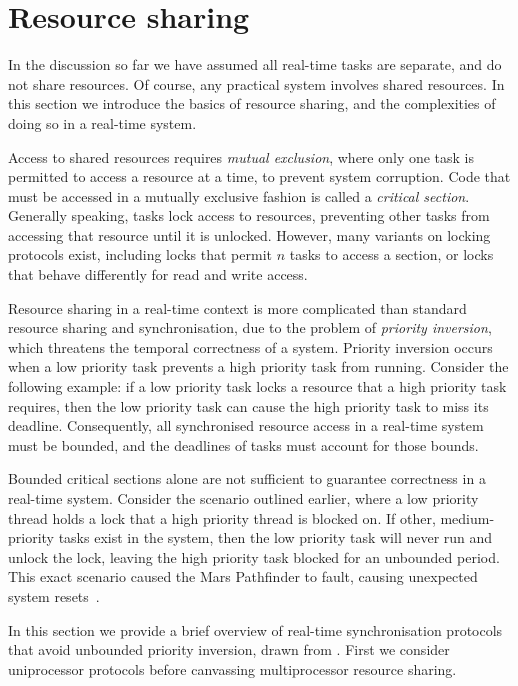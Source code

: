 \section{Resource sharing}
\label{sec:resource-sharing-theory}

In the discussion so far we have assumed all real-time tasks are separate, and do not share resources.
Of course, any practical system involves shared resources. In this section we introduce the basics
of resource sharing, and the complexities of doing so in a real-time system.

Access to shared resources requires \emph{mutual exclusion}, where only one 
task is permitted to access a resource at a time, to prevent system corruption. Code that
must be accessed in a mutually exclusive fashion is called a \emph{critical section}. Generally
speaking, tasks lock access to resources, preventing other tasks from accessing that resource
until it is unlocked. However, many variants on locking protocols exist, including locks that permit
$n$ tasks to access a section, or locks that behave differently for read and write access.

Resource sharing in a real-time context is more complicated than standard resource sharing and
synchronisation, due to the problem of \emph{priority inversion}, which threatens the temporal
correctness of a system.  Priority inversion occurs when a low priority task prevents a high
priority task from running.  Consider the following example: if a low priority task locks a resource
that a high priority task requires, then the low priority task can cause the high priority task to
miss its deadline.  Consequently, all synchronised resource access in a real-time system must be
bounded, and the deadlines of tasks must account for those bounds.

Bounded critical sections alone are not sufficient to guarantee correctness in a real-time
system. Consider the scenario outlined earlier, where a low priority thread holds a lock that a high
priority thread is blocked on.  If other, medium-priority tasks exist in the system, then the low
priority task will never run and unlock the lock, leaving the high priority task blocked for an
unbounded period.  This exact scenario caused the Mars Pathfinder to fault, causing unexpected
system resets~\citep{Mars_Pathfinder}.

In this section we provide a brief overview of real-time synchronisation protocols that
avoid unbounded priority inversion, drawn from \citet{Sha_RL_90}. First we consider uniprocessor
protocols before canvassing multiprocessor resource sharing.

